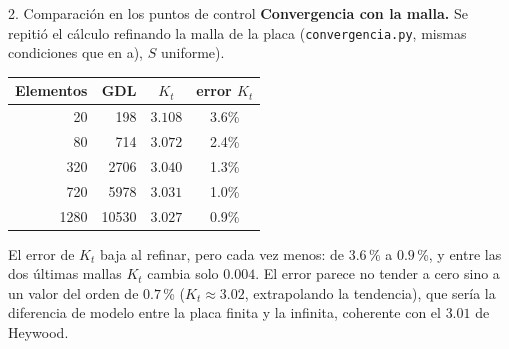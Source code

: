 \begin{desarrollo}{2. Comparaci\'on en los puntos de control}
\textbf{Convergencia con la malla.} Se repiti\'o el c\'alculo refinando la malla
de la placa (\texttt{convergencia.py}, mismas condiciones que en a), $S$ uniforme).

\begin{center}
\renewcommand{\arraystretch}{1.2}
\begin{tabular}{@{}rrcc@{}}
\toprule
Elementos & GDL & $K_t$ & error $K_t$\\
\midrule
20   & 198    & $3.108$ & 3.6\%\\
80   & 714    & $3.072$ & 2.4\%\\
320  & 2706   & $3.040$ & 1.3\%\\
720  & 5978   & $3.031$ & 1.0\%\\
1280 & 10530  & $3.027$ & 0.9\%\\
\bottomrule
\end{tabular}
\end{center}

El error de $K_t$ baja al refinar, pero cada vez menos: de $3.6$\,\% a
$0.9$\,\%, y entre las dos \'ultimas mallas $K_t$ cambia solo $0.004$. El error
parece no tender a cero sino a un valor del orden de $0.7$\,\% ($K_t\approx3.02$,
extrapolando la tendencia), que ser\'ia la diferencia de modelo entre la placa
finita y la infinita, coherente con el $3.01$ de Heywood.
\end{desarrollo}

